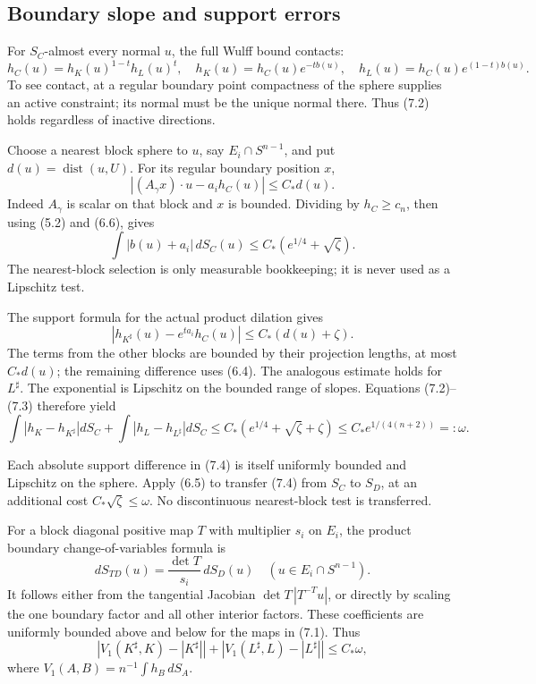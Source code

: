 \documentclass[11pt,reqno]{amsart}
\numberwithin{equation}{section}
\theoremstyle{remark}
\theoremstyle{definition}
\begin{document}
\subsection{Boundary slope and support errors}

For \(S_C\)-almost every normal \(u\), the full Wulff bound contacts:
\[
h_C(u)=h_K(u)^{1-t}h_L(u)^t,\quad
h_K(u)=h_C(u)e^{-tb(u)},\quad h_L(u)=h_C(u)e^{(1-t)b(u)}.              \tag{7.2}
\]
To see contact, at a regular boundary point compactness of the sphere supplies an active constraint; its normal must be the unique normal there. Thus (7.2) holds regardless of inactive directions.

Choose a nearest block sphere to \(u\), say \(E_i\cap S^{n-1}\), and put \(d(u)=\operatorname{dist}(u,U)\). For its regular boundary position \(x\),
\[
|(A_\gamma x)\cdot u-a_i h_C(u)|\le C_*d(u).
\]
Indeed \(A_\gamma\) is scalar on that block and \(x\) is bounded. Dividing by \(h_C\ge c_n\), then using (5.2) and (6.6), gives
\[
\int|b(u)+a_i|\,dS_C(u)\le C_*(e^{1/4}+\sqrt\zeta).                  \tag{7.3}
\]
The nearest-block selection is only measurable bookkeeping; it is never used as a Lipschitz test.

The support formula for the actual product dilation gives
\[
|h_{K^\sharp}(u)-e^{ta_i}h_C(u)|\le C_*(d(u)+\zeta).
\]
The terms from the other blocks are bounded by their projection lengths, at most \(C_*d(u)\); the remaining difference uses (6.4). The analogous estimate holds for \(L^\sharp\).
The exponential is Lipschitz on the bounded range of slopes. Equations (7.2)--(7.3) therefore yield
\[
\int |h_K-h_{K^\sharp}|dS_C+
\int |h_L-h_{L^\sharp}|dS_C
\le C_*(e^{1/4}+\sqrt\zeta+\zeta)
\le C_*e^{1/(4(n+2))}=:\omega.                        \tag{7.4}
\]

Each absolute support difference in (7.4) is itself uniformly bounded and Lipschitz on the sphere. Apply (6.5) to transfer (7.4) from \(S_C\) to \(S_D\), at an additional cost \(C_*\sqrt\zeta\le\omega\). No discontinuous nearest-block test is transferred.

For a block diagonal positive map \(T\) with multiplier \(s_i\) on \(E_i\), the product boundary change-of-variables formula is
\[
dS_{TD}(u)=\frac{\det T}{s_i}\,dS_D(u)\quad(u\in E_i\cap S^{n-1}).   \tag{7.5}
\]
It follows either from the tangential Jacobian \(\det T\,|T^{-T}u|\), or directly by scaling the one boundary factor and all other interior factors. These coefficients are uniformly bounded above and below for the maps in (7.1). Thus
\[
\left|V_1(K^\sharp,K)-|K^\sharp|\right|
+\left|V_1(L^\sharp,L)-|L^\sharp|\right|\le C_*\omega,                \tag{7.6}
\]
where \(V_1(A,B)=n^{-1}\int h_B\,dS_A\).
\end{document}

